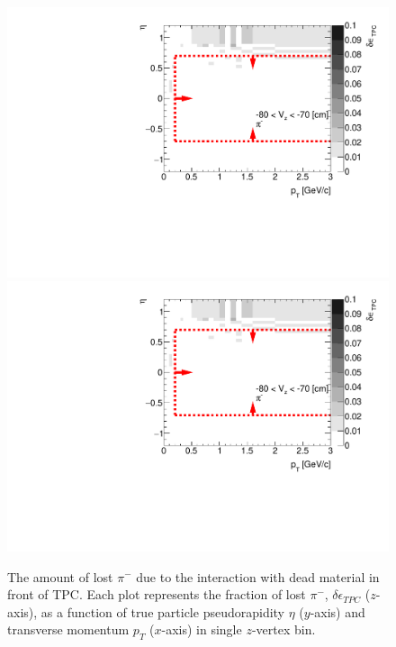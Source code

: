 \begin{figure}[hb]
\caption[The amount of lost $\pi^-$ due to the interaction with dead material in front of TPC as a function of $p_T$, $\eta$ and $z$-vertex in CD and SD]{The amount of lost $\pi^-$ due to the interaction with dead material in front of TPC. Each plot represents the fraction of lost $\pi^-$, $\delta\epsilon_{ TPC}$ ($z$-axis), as a function of true particle pseudorapidity $\eta$ ($y$-axis) and transverse momentum $p_{T}$ ($x$-axis) in single $z$-vertex bin.}\label{fig:dead_materialCDSD3D}
\centering
\parbox{0.495\textwidth}{
  \centering
  \includegraphics[width=\linewidth,page=1]{graphics/systematicsEfficiency/deadMaterial/secondaries_Unbinned_SDCD_.pdf}\\
  \includegraphics[width=\linewidth,page=3]{graphics/systematicsEfficiency/deadMaterial/secondaries_Unbinned_SDCD_.pdf}\\
}
\end{figure}

